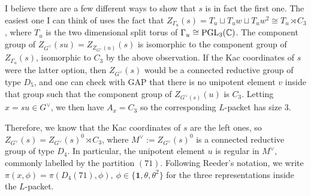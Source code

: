 \begin{minipage}[t]{0.45\textwidth}
\end{minipage}
\hfill %
\begin{minipage}[t]{0.45\textwidth}
\end{minipage}

I believe there are a few different ways to show that $s$ is in fact the first one. The easiest one I can think of uses the fact that $Z_{\Gamma_u}(s)=T_u\sqcup T_uw\sqcup T_uw^2\cong T_u\rtimes C_3$, where $T_u$ is the two dimensional split torus of $\Gamma_u\cong\mathrm{PGL}_3(\mathbb{C})$. The component group of $Z_{G^\vee}(su)=Z_{Z_{G^\vee}(u)}(s)$ is isomorphic to the component group of $Z_{\Gamma_u}(s)$, isomorphic to $C_3$ by the above observation. If the Kac coordinates of $s$ were the latter option, then $Z_{G^\vee}(s)$ would be a connected reductive group of type $D_5$, and one can check with GAP that there is no unipotent element $v$ inside that group such that the component group of $Z_{G^\vee(s)}(u)$ is $C_3$. Letting $x=su\in G^\vee$, we then have $A_x=C_3$ so the corresponding $L$-packet has size $3$.

Therefore, we know that the Kac coordinates of $s$ are the left ones, so $Z_{G^\vee}(s)=Z_{G^\vee}(s)^0\rtimes C_3$, where $M^\vee:=Z_{G^\vee}(s)^0$ is a connected reductive group of type $D_4$. In particular, the unipotent element $u$ is regular in $M^\vee$, commonly labelled by the partition $(71)$. Following Reeder's notation, we write $\pi(x,\phi)=\pi(D_4(71),\phi),\ \phi\in\{\mathbf{1},\theta,\theta^2\}$ for the three representations inside the $L$-packet.

